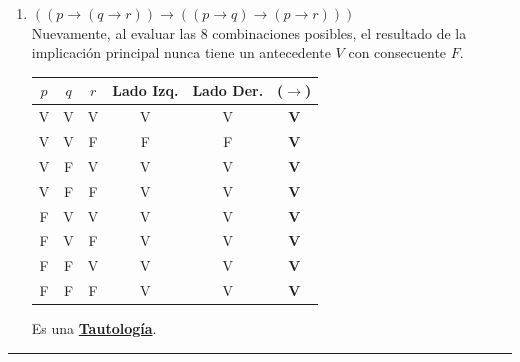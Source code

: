 \begin{enumerate}[label=\textbf{\alph*)}]
    \vspace{0.4cm}
    \item \textbf{$((p \rightarrow (q \rightarrow r)) \rightarrow ((p \rightarrow q) \rightarrow (p \rightarrow r)))$} \\
    Nuevamente, al evaluar las 8 combinaciones posibles, el resultado de la implicación principal nunca tiene un antecedente $V$ con consecuente $F$.
    \begin{center}
    \begin{tabular}{|c|c|c|c|c|c|}
    \hline
    $p$ & $q$ & $r$ & Lado Izq. & Lado Der. & ($\rightarrow$) \\
    \hline
    V & V & V & V & V & \textbf{V} \\
    V & V & F & F & F & \textbf{V} \\
    V & F & V & V & V & \textbf{V} \\
    V & F & F & V & V & \textbf{V} \\
    F & V & V & V & V & \textbf{V} \\
    F & V & F & V & V & \textbf{V} \\
    F & F & V & V & V & \textbf{V} \\
    F & F & F & V & V & \textbf{V} \\
    \hline
    \end{tabular}
    \end{center}
    Es una \underline{\textbf{Tautología}}.

\end{enumerate}

\vspace{0.5cm}
\hrule
\vspace{0.5cm}